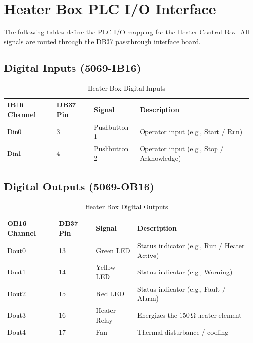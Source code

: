 \documentclass[main.tex]{subfiles}
\begin{document}
\section{Heater Box PLC I/O Interface}

The following tables define the PLC I/O mapping for the Heater Control Box. All signals are routed through the DB37 passthrough interface board.

\subsection{Digital Inputs (5069-IB16)}

\begin{table}[H]
\centering
\caption{Heater Box Digital Inputs}
\label{tab:heater-din}
\begin{tabularx}{\textwidth}{l l l X}
\hline
\textbf{IB16 Channel} & \textbf{DB37 Pin} & \textbf{Signal} & \textbf{Description} \\
\hline
Din0 & 3 & Pushbutton 1 & Operator input (e.g., Start / Run) \\
Din1 & 4 & Pushbutton 2 & Operator input (e.g., Stop / Acknowledge) \\
\hline
\end{tabularx}
\end{table}

\subsection{Digital Outputs (5069-OB16)}

\begin{table}[H]
\centering
\caption{Heater Box Digital Outputs}
\label{tab:heater-dout}
\begin{tabularx}{\textwidth}{l l l X}
\hline
\textbf{OB16 Channel} & \textbf{DB37 Pin} & \textbf{Signal} & \textbf{Description} \\
\hline
Dout0 & 13 & Green LED & Status indicator (e.g., Run / Heater Active) \\
Dout1 & 14 & Yellow LED & Status indicator (e.g., Warning) \\
Dout2 & 15 & Red LED & Status indicator (e.g., Fault / Alarm) \\
Dout3 & 16 & Heater Relay & Energizes the 150\,\si{\ohm} heater element \\
Dout4 & 17 & Fan & Thermal disturbance / cooling \\
\hline
\end{tabularx}
\end{table}
\end{document}
